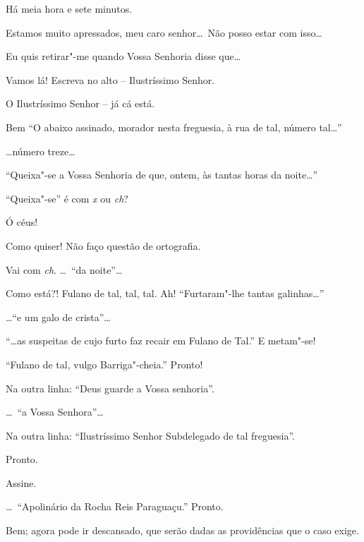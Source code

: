   Há meia hora e sete minutos.

 Estamos muito apressados, meu caro senhor\ldots\ Não posso estar
com isso\ldots

 Eu quis retirar"-me quando Vossa Senhoria disse que\ldots

 Vamos lá! Escreva no alto -- Ilustríssimo Senhor.

 O Ilustríssimo Senhor -- já cá está.

 Bem  “O abaixo assinado, morador nesta
freguesia, à rua de tal, número tal\ldots”

  \ldots número treze\ldots

 “Queixa"-se a Vossa Senhoria de que, ontem, às tantas horas da
noite\ldots”

 “Queixa"-se” é com \textit{x} ou \textit{ch}?

 Ó céus! 

 Como quiser! Não faço questão de ortografia.

 Vai com \textit{ch}. \ldots\ “da noite”\ldots

 Como está?!  Fulano de tal, tal, tal. Ah!
 “Furtaram"-lhe tantas galinhas\ldots”

  \ldots``e um galo de crista”\ldots

 “\ldots as suspeitas de cujo furto faz recair em Fulano de Tal.”
 E metam"-se!

  “Fulano de tal, vulgo
Barriga"-cheia.” Pronto!

 Na outra linha: “Deus guarde a Vossa senhoria”.

 \ldots\ “a Vossa Senhora”\ldots

 Na outra linha: “Ilustríssimo Senhor Subdelegado de tal
freguesia”.

 Pronto.

 Assine.

 \ldots\ “Apolinário da Rocha Reis Paraguaçu.”
 Pronto.

 Bem; agora pode ir descansado, que serão dadas as providências
que o caso exige.

